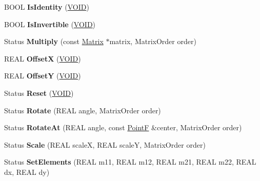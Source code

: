 \begin{DoxyCompactItemize}
\item 
\mbox{\label{class_matrix_a78a46b253ea386c46eb1a079ada615a5}} 
B\+O\+OL {\bfseries Is\+Identity} (\hyperlink{interfacevoid}{V\+O\+ID})
\item 
\mbox{\label{class_matrix_a9ed33b1c50cd6b0f0ca9c18144ead642}} 
B\+O\+OL {\bfseries Is\+Invertible} (\hyperlink{interfacevoid}{V\+O\+ID})
\item 
\mbox{\label{class_matrix_a49367d7d67247d4147a07e1cbed7729f}} 
Status {\bfseries Multiply} (const \hyperlink{class_matrix}{Matrix} $\ast$matrix, Matrix\+Order order)
\item 
\mbox{\label{class_matrix_a13154eae488cb85104cd9f7e5532e4bc}} 
R\+E\+AL {\bfseries OffsetX} (\hyperlink{interfacevoid}{V\+O\+ID})
\item 
\mbox{\label{class_matrix_a0f3bfa4f22a427b0ff7a136809deaffe}} 
R\+E\+AL {\bfseries OffsetY} (\hyperlink{interfacevoid}{V\+O\+ID})
\item 
\mbox{\label{class_matrix_a60af8b220b01f5149afd2861258b21f2}} 
Status {\bfseries Reset} (\hyperlink{interfacevoid}{V\+O\+ID})
\item 
\mbox{\label{class_matrix_adca16c085e74ae2c9677dc2b0793bd7f}} 
Status {\bfseries Rotate} (R\+E\+AL angle, Matrix\+Order order)
\item 
\mbox{\label{class_matrix_ab4cb1f8e8a55bca57d12b3bcb75fcc21}} 
Status {\bfseries Rotate\+At} (R\+E\+AL angle, const \hyperlink{struct_point_f}{PointF} \&center, Matrix\+Order order)
\item 
\mbox{\label{class_matrix_a1344adba3561f913abe8ee2a77b8fd85}} 
Status {\bfseries Scale} (R\+E\+AL scaleX, R\+E\+AL scaleY, Matrix\+Order order)
\item 
\mbox{\label{class_matrix_aa2508eec153754a2529e62f03e1db751}} 
Status {\bfseries Set\+Elements} (R\+E\+AL m11, R\+E\+AL m12, R\+E\+AL m21, R\+E\+AL m22, R\+E\+AL dx, R\+E\+AL dy)
\item 
\mbox{\label{class_matrix_ab9607ee87f9d61276dfc9ac6a8cc1384}} 

\end{DoxyCompactItemize}
